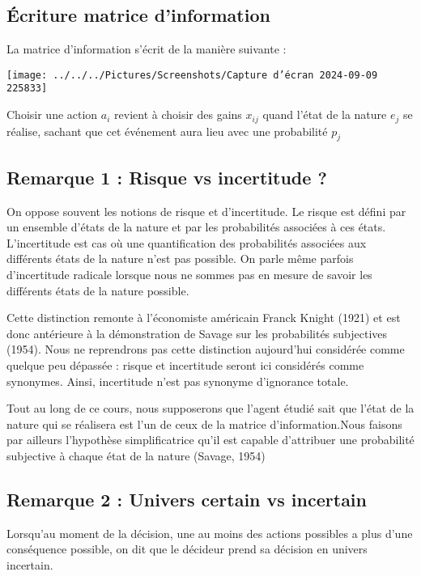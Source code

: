 \documentclass[a4paper, 12pt]{report}
\begin{document}
\subsection{Écriture matrice d'information}

La matrice d'information s'écrit de la manière suivante :

\begin{center}
	\texttt{[image: ../../../Pictures/Screenshots/Capture d'écran 2024-09-09 225833]}
\end{center}

Choisir une action $a_i$ revient à choisir des gains $x_{ij}$ quand l'état de la nature $e_j$ se réalise, sachant que cet événement aura lieu avec une probabilité $p_j$

\subsection{Remarque 1 : Risque vs incertitude ?}

On oppose souvent les notions de risque et d’incertitude. Le risque est défini par un ensemble d’états de la nature et par les probabilités associées à ces états. L'incertitude est cas où une quantification des probabilités associées
aux différents états de la nature n’est pas possible. On parle même parfois d’incertitude radicale lorsque nous ne sommes pas en mesure de savoir les différents états de la nature possible. 

Cette distinction remonte à l'économiste américain Franck Knight (1921) et est donc antérieure à la démonstration de Savage sur les probabilités subjectives (1954). Nous ne reprendrons pas cette distinction aujourd'hui considérée comme quelque peu dépassée : risque et incertitude seront ici considérés comme synonymes. Ainsi, incertitude n'est pas synonyme d'ignorance totale.

Tout au long de ce cours, nous supposerons que l’agent étudié sait que l'état de la nature qui se réalisera est l'un de ceux de la matrice d'information.Nous faisons par ailleurs l'hypothèse simplificatrice qu'il est capable d'attribuer une probabilité subjective à chaque état de la nature (Savage, 1954)

\subsection{Remarque 2 : Univers certain vs incertain}

Lorsqu'au moment de la décision, une au moins des actions possibles a plus d'une conséquence possible, on dit que le décideur prend sa décision en univers incertain.
\end{document}
